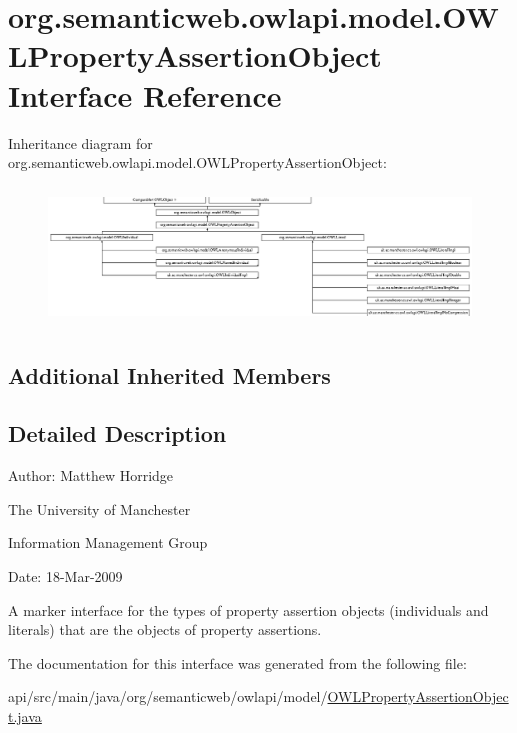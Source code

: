\hypertarget{interfaceorg_1_1semanticweb_1_1owlapi_1_1model_1_1_o_w_l_property_assertion_object}{\section{org.\-semanticweb.\-owlapi.\-model.\-O\-W\-L\-Property\-Assertion\-Object Interface Reference}
\label{interfaceorg_1_1semanticweb_1_1owlapi_1_1model_1_1_o_w_l_property_assertion_object}
}
Inheritance diagram for org.\-semanticweb.\-owlapi.\-model.\-O\-W\-L\-Property\-Assertion\-Object\-:\begin{figure}[H]
\begin{center}
\leavevmode
\includegraphics[height=3.703704cm]{interfaceorg_1_1semanticweb_1_1owlapi_1_1model_1_1_o_w_l_property_assertion_object}
\end{center}
\end{figure}
\subsection*{Additional Inherited Members}


\subsection{Detailed Description}
Author\-: Matthew Horridge\par
 The University of Manchester\par
 Information Management Group\par
 Date\-: 18-\/\-Mar-\/2009

A marker interface for the types of property assertion objects (individuals and literals) that are the objects of property assertions. 

The documentation for this interface was generated from the following file\-:\begin{DoxyCompactItemize}
\item 
api/src/main/java/org/semanticweb/owlapi/model/\hyperlink{_o_w_l_property_assertion_object_8java}{O\-W\-L\-Property\-Assertion\-Object.\-java}\end{DoxyCompactItemize}
